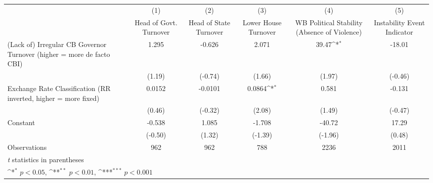 {
\def\sym#1{\ifmmode^{#1}\else\(^{#1}\)\fi}
\begin{tabular*}{\linewidth}{@{\hskip\tabcolsep\extracolsep\fill}l*{5}{c}}
\toprule
                &\multicolumn{1}{c}{(1)}&\multicolumn{1}{c}{(2)}&\multicolumn{1}{c}{(3)}&\multicolumn{1}{c}{(4)}&\multicolumn{1}{c}{(5)}\\
                &\multicolumn{1}{c}{Head of Govt. Turnover}&\multicolumn{1}{c}{Head of State Turnover}&\multicolumn{1}{c}{Lower House Turnover}&\multicolumn{1}{c}{WB Political Stability (Absence of Violence)}&\multicolumn{1}{c}{Instability Event Indicator}\\
\midrule
(Lack of) Irregular CB Governor Turnover (higher = more de facto CBI)&    1.295         &   -0.626         &    2.071         &    39.47\sym{*}  &   -18.01         \\
                &   (1.19)         &  (-0.74)         &   (1.66)         &   (1.97)         &  (-0.46)         \\
\addlinespace
Exchange Rate Classification (RR inverted, higher = more fixed)&   0.0152         &  -0.0101         &   0.0864\sym{*}  &    0.581         &   -0.131         \\
                &   (0.46)         &  (-0.32)         &   (2.08)         &   (1.49)         &  (-0.47)         \\
\addlinespace
Constant        &   -0.538         &    1.085         &   -1.708         &   -40.72         &    17.29         \\
                &  (-0.50)         &   (1.32)         &  (-1.39)         &  (-1.96)         &   (0.48)         \\
\midrule
Observations    &      962         &      962         &      788         &     2236         &     2011         \\
\bottomrule
\multicolumn{6}{l}{\footnotesize \textit{t} statistics in parentheses}\\
\multicolumn{6}{l}{\footnotesize \sym{*} \(p<0.05\), \sym{**} \(p<0.01\), \sym{***} \(p<0.001\)}\\
\end{tabular*}
}
